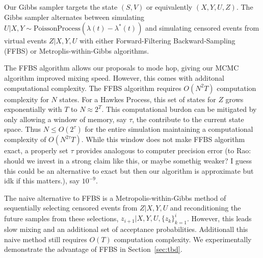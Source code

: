 \documentclass[11pt]{article}
\newcommand{\algrule}[1][.2pt]{\par\vskip.5\baselineskip\hrule height #1\par\vskip.5\baselineskip}
\begin{document}
Our Gibbs sampler targets the state $(S,V)$ or equivalently $(X,Y,U,Z)$. The Gibbs sampler alternates between simulating $U|X,Y \sim \text{PoissonProcess}(\lambda(t) - \lambda^*(t))$ and simulating censored events from virtual events $Z|X,Y,U$ with either Forward-Filtering Backward-Sampling (FFBS) or Metroplis-within-Gibbs algorithms. 


The FFBS algorithm allows our proposals to mode hop, giving our MCMC algorithm improved mixing speed. However, this comes with additonal computational complexity. The FFBS algorithm requires $O(N^2T)$ computation complexity for $N$ states. For a Hawkes Process, this set of states for $Z$ grows exponentially with $T$ to $N \approx 2^T$. This computational burdon can be mitigated by only allowing a window of memory, say $\tau$, the contribute to the current state space. Thus $N \leq O(2^\tau)$ for the entire simulation maintaining a computational complexity of $O(N^{2\tau} T)$. While this window does not make FFBS algorithm exact, a properly set $\tau$ provides analogous to computer precision error (to Rao: should we invest in a strong claim like this, or maybe somethig weaker? I guess this could be an alternative to exact but then our algorithm is approximate but idk if this matters.), say $10^{-9}$.


The naive alternative to FFBS is a Metropolis-within-Gibbs method of sequentially selecting censored events from $Z|X,Y,U$ and reconditioning the future samples from these selections, $z_{i+1} | X,Y,U,\{z_k\}_{k=1}^i$. However, this leads slow mixing and an additional set of acceptance probabilities. Additionall this naive method still requires $O(T)$ computation complexity. We experimentally demonstrate the advantage of FFBS in Section~\ref{sec:tbd}.



\end{document}
